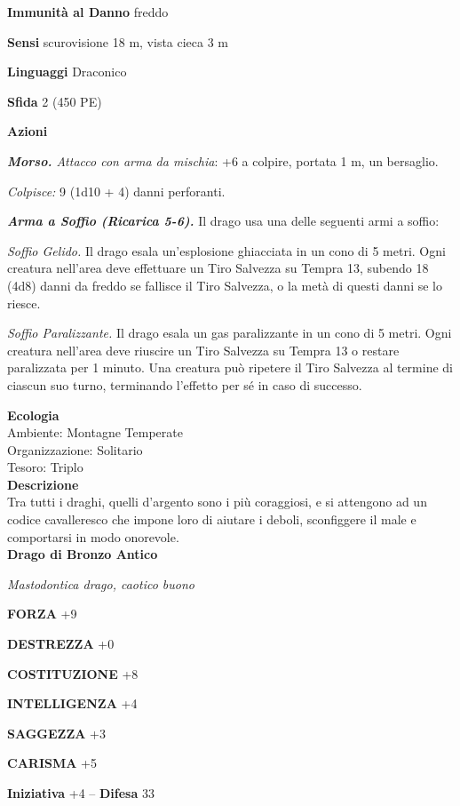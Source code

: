 \begin{multicols}{2}
\textbf{Immunità al Danno} freddo

\textbf{Sensi} scurovisione 18 m, vista cieca 3 m

\textbf{Linguaggi} Draconico

\textbf{Sfida} 2 (450 PE)

\textbf{Azioni}

\emph{\textbf{Morso.} Attacco con arma da mischia}: +6 a colpire, portata 1 m, un bersaglio.

\emph{Colpisce:} 9 (1d10 + 4) danni perforanti.

\emph{\textbf{Arma a Soffio (Ricarica 5-6).}} Il drago usa una delle seguenti armi a soffio:

\emph{Soffio Gelido.} Il drago esala un'esplosione ghiacciata in un cono di 5 metri. Ogni creatura nell'area deve effettuare un Tiro Salvezza su Tempra 13, subendo 18 (4d8) danni da freddo se fallisce il Tiro Salvezza, o la metà di questi danni se lo riesce.

\emph{Soffio Paralizzante.} Il drago esala un gas paralizzante in un cono di 5 metri. Ogni creatura nell'area deve riuscire un Tiro Salvezza su Tempra 13 o restare paralizzata per 1 minuto. Una creatura può ripetere il Tiro Salvezza al termine di ciascun suo turno, terminando l'effetto per sé in caso di successo.

\textbf{Ecologia}\\
Ambiente: Montagne Temperate\\
Organizzazione: Solitario\\
Tesoro: Triplo\\
\textbf{Descrizione}\\
Tra tutti i draghi, quelli d'argento sono i più coraggiosi, e si attengono ad un codice cavalleresco che impone loro di aiutare i deboli, sconfiggere il male e comportarsi in modo onorevole.\\


\medskip{}\textbf{Drago di Bronzo Antico}

\emph{Mastodontica drago, caotico buono}

\textbf{FORZA} +9

\textbf{DESTREZZA} +0

\textbf{COSTITUZIONE} +8

\textbf{INTELLIGENZA} +4

\textbf{SAGGEZZA} +3

\textbf{CARISMA} +5

\textbf{Iniziativa} +4 -- \textbf{Difesa} 33


\end{multicols}
